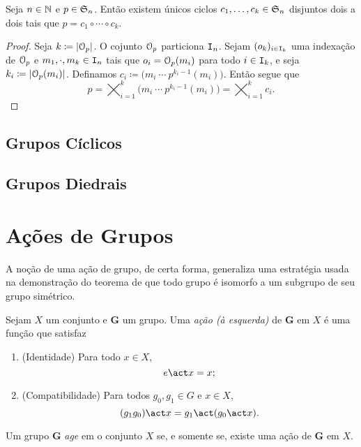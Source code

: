 \begin{prop}
	Seja $n \in \mathbb{N}$ e $p \in \mathfrak{S}_n$. Então existem únicos ciclos $c_1,\ldots,c_k \in \mathfrak{S}_n$ disjuntos dois a dois tais que $p=c_1 \circ \cdots \circ c_k$.
\end{prop}
\begin{proof}
	Seja $k \coloneqq \card{\orb_p}$. O cojunto $\mathcal{O}_p$ particiona $\mathtt I_n$. Sejam $(o_k)_{i \in \mathtt I_k}$ uma indexação de $\mathcal{O}_p$ e $m_1,\cdot,m_k \in \mathtt I_n$ tais que $o_i=\mathcal{O}_p(m_i)$ para todo $i \in \mathtt I_k$, e seja $k_i \coloneqq \card{\orb_p(m_i)}$. Definamos $c_i \coloneqq  \bigl( m_i \ \cdots \  p^{k_i-1}(m_i)\bigr)$. Então segue que
	\begin{equation*}
	p = \bigtimes_{i=1}^k \bigl( m_i \ \cdots \  p^{k_i-1}(m_i)\bigr) = \bigtimes_{i=1}^k c_i.
	\end{equation*}
\end{proof}



\subsection{Grupos Cíclicos}

\subsection{Grupos Diedrais}


\cleardoublepage
\section{Ações de Grupos}

A noção de uma ação de grupo, de certa forma, generaliza uma estratégia usada na demonstração do teorema de que todo grupo é isomorfo a um subgrupo de seu grupo simétrico.

\begin{defi}
Sejam $X$ um conjunto e $\bm G$ um grupo. Uma \emph{ação (à esquerda)} de $\bm G$ em $X$ é uma função
que satisfaz
\begin{enumerate}
\item (Identidade) Para todo $x \in X$,
	\begin{equation*}
	e \act x = x;
	\end{equation*}
\item (Compatibilidade) Para todos $g_0,g_1 \in G$ e $x \in X$,
	\begin{equation*}
	(g_1g_0) \act x = g_1 \act (g_0 \act x).
	\end{equation*}
\end{enumerate}
Um grupo $\bm G$ \emph{age} em o conjunto $X$ se, e somente se, existe uma ação de $\bm G$ em $X$.
\end{defi}

